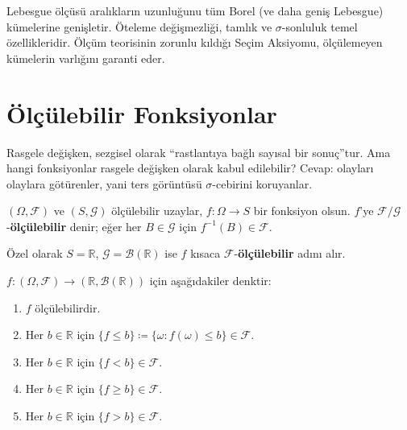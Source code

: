\begin{mikroozet}[§1.4 özeti]
Lebesgue ölçüsü aralıkların uzunluğunu tüm Borel (ve daha geniş Lebesgue)
kümelerine genişletir. Öteleme değişmezliği, tamlık ve $\sigma$-sonluluk
temel özellikleridir. Ölçüm teorisinin zorunlu kıldığı Seçim Aksiyomu,
ölçülemeyen kümelerin varlığını garanti eder.
\end{mikroozet}


\section{Ölçülebilir Fonksiyonlar}

\begin{tanimgerekce}
Rasgele değişken, sezgisel olarak ``rastlantıya bağlı sayısal bir sonuç''tur.
Ama hangi fonksiyonlar rasgele değişken olarak kabul edilebilir? Cevap:
olayları olaylara götürenler, yani ters görüntüsü $\sigma$-cebirini koruyanlar.
\end{tanimgerekce}

\begin{tanim}\label{def:olculebilfon}
$(\Omega, \mathcal{F})$ ve $(S, \mathcal{G})$ ölçülebilir uzaylar,
$f: \Omega \to S$ bir fonksiyon olsun.
$f$'ye $\mathcal{F}/\mathcal{G}$-\textbf{ölçülebilir} denir;
eğer her $B \in \mathcal{G}$ için $f^{-1}(B) \in \mathcal{F}$.

Özel olarak $S = \mathbb{R}$, $\mathcal{G} = \mathcal{B}(\mathbb{R})$ ise
$f$ kısaca $\mathcal{F}$-\textbf{ölçülebilir} adını alır.
\end{tanim}

\begin{teorem}\label{thm:olculebichar}
$f: (\Omega,\mathcal{F}) \to (\mathbb{R}, \mathcal{B}(\mathbb{R}))$ için
aşağıdakiler denktir:
\begin{enumerate}[label=(\roman*)]
  \item $f$ ölçülebilirdir.
  \item Her $b \in \mathbb{R}$ için $\{f \leq b\} \coloneqq \{\omega : f(\omega) \leq b\} \in \mathcal{F}$.
  \item Her $b \in \mathbb{R}$ için $\{f < b\} \in \mathcal{F}$.
  \item Her $b \in \mathbb{R}$ için $\{f \geq b\} \in \mathcal{F}$.
  \item Her $b \in \mathbb{R}$ için $\{f > b\} \in \mathcal{F}$.
\end{enumerate}
\end{teorem}

